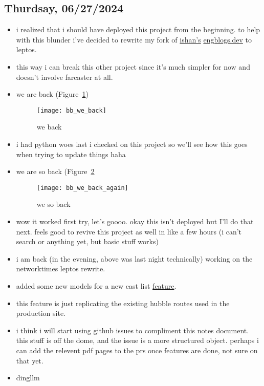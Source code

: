 \subsection*{Thurdsay, 06/27/2024}
\begin{itemize}
    \item i realized that i should have deployed this project from the
        beginning. to help with this blunder i've decided to rewrite my fork of
        \textcolor{blue}{\href{https://github.com/ishan0102/engblogs}{ishan's}}
        \textcolor{blue}{\href{https://engblogs.dev}{engblogs.dev}} to leptos.
    \item this way i can break this other project since it's much simpler for
        now and doesn't involve farcaster at all. 
    \item we are back (Figure~\ref{fig:bb_we_back})
        \begin{figure}[ht]
            \centering
            \texttt{[image: bb\_we\_back]}
            \captionsetup{labelfont=bf, textfont=it}
            \caption{we back}
            \label{fig:bb_we_back}
        \end{figure}
    \item i had python woes last i checked on this project so we'll see how this
        goes when trying to update things haha
    \item we are so back (Figure~\ref{fig:bb_we_back_again}
        \begin{figure}[ht]
            \centering
            \texttt{[image: bb\_we\_back\_again]}
            \captionsetup{labelfont=bf, textfont=it}
            \caption{we so back}
            \label{fig:bb_we_back_again}
        \end{figure}
    \item wow it worked first try, let's goooo. okay this isn't deployed but
        I'll do that next. feels good to revive this project as well in like a
        few hours (i can't search or anything yet, but basic stuff works)

    \clearpage
    \item i am back (in the evening, above was last night technically) working
        on the networktimes leptos rewrite.
    \item added some new models for a new cast list
        \textcolor{blue}{\href{https://github.com/iturner72/thenetworktimes/issues/3}{feature}}.
    \item this feature is just replicating the existing hubble routes used in
        the production site.
    \item i think i will start using github issues to compliment this notes
        document. this stuff is off the dome, and the issue is a more structured
        object. perhaps i can add the relevent pdf pages to the prs once
        features are done, not sure on that yet.
    \item dingllm 

\end{itemize}
